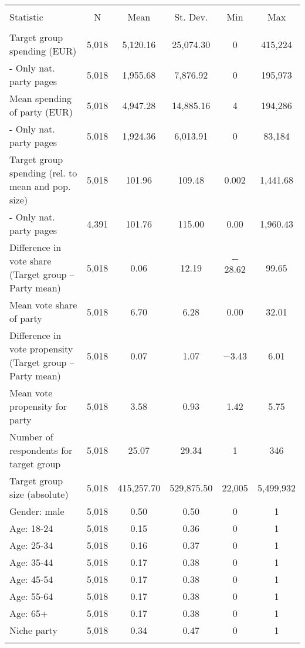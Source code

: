 
\begin{table}[!htbp] \centering 
  \caption{} 
  \label{} 
\begin{tabular}{@{\extracolsep{5pt}}lccccc} 
\\[-1.8ex]\hline 
\hline \\[-1.8ex] 
Statistic & \multicolumn{1}{c}{N} & \multicolumn{1}{c}{Mean} & \multicolumn{1}{c}{St. Dev.} & \multicolumn{1}{c}{Min} & \multicolumn{1}{c}{Max} \\ 
\hline \\[-1.8ex] 
Target group spending (EUR) & 5,018 & 5,120.16 & 25,074.30 & 0 & 415,224 \\ 
 - Only nat. party pages & 5,018 & 1,955.68 & 7,876.92 & 0 & 195,973 \\ 
Mean spending of party (EUR) & 5,018 & 4,947.28 & 14,885.16 & 4 & 194,286 \\ 
 - Only nat. party pages & 5,018 & 1,924.36 & 6,013.91 & 0 & 83,184 \\ 
Target group spending (rel. to mean and pop. size) & 5,018 & 101.96 & 109.48 & 0.002 & 1,441.68 \\ 
 - Only nat. party pages & 4,391 & 101.76 & 115.00 & 0.00 & 1,960.43 \\ 
Difference in vote share (Target group –  Party mean) & 5,018 & 0.06 & 12.19 & $-$28.62 & 99.65 \\ 
Mean vote share of party & 5,018 & 6.70 & 6.28 & 0.00 & 32.01 \\ 
Difference in vote propensity (Target group –  Party mean) & 5,018 & 0.07 & 1.07 & $-$3.43 & 6.01 \\ 
Mean vote propensity for party & 5,018 & 3.58 & 0.93 & 1.42 & 5.75 \\ 
Number of respondents for target group & 5,018 & 25.07 & 29.34 & 1 & 346 \\ 
Target group size (absolute) & 5,018 & 415,257.70 & 529,875.50 & 22,005 & 5,499,932 \\ 
Gender: male & 5,018 & 0.50 & 0.50 & 0 & 1 \\ 
Age: 18-24 & 5,018 & 0.15 & 0.36 & 0 & 1 \\ 
Age: 25-34 & 5,018 & 0.16 & 0.37 & 0 & 1 \\ 
Age: 35-44 & 5,018 & 0.17 & 0.38 & 0 & 1 \\ 
Age: 45-54 & 5,018 & 0.17 & 0.38 & 0 & 1 \\ 
Age: 55-64 & 5,018 & 0.17 & 0.38 & 0 & 1 \\ 
Age: 65+ & 5,018 & 0.17 & 0.38 & 0 & 1 \\ 
Niche party & 5,018 & 0.34 & 0.47 & 0 & 1 \\ 
\hline \\[-1.8ex] 
\end{tabular} 
\end{table} 

